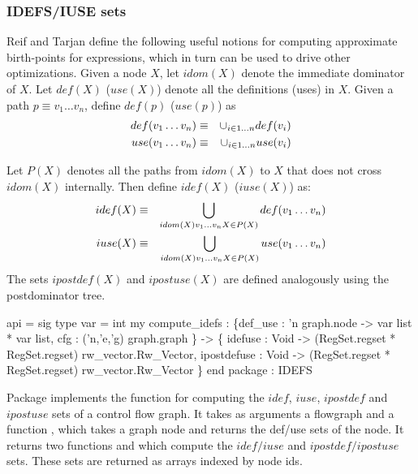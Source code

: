\subsubsection{IDEFS/IUSE sets}
Reif and Tarjan define the following useful notions for
computing approximate birth-points for expressions,  which in turn
can be used to drive other optimizations.
Given a node $X$, let $idom(X)$ denote the immediate dominator of $X$.
Let $def(X)$ ($use(X)$) denote all the definitions (uses) in $X$. 
Given a path $p \equiv v_1\ldots v_n$, define $def(p)$ ($use(p)$) as
\begin{eqnarray*}
   def(v_1\ldots v_n) & \equiv &\cup_{i \in 1 \ldots n} def(v_i) \\
   use(v_1\ldots v_n) & \equiv &\cup_{i \in 1 \ldots n} use(v_i)
\end{eqnarray*}

Let $P(X)$ denotes all the paths from $idom(X)$ to $X$
that does not cross $idom(X)$ internally.    Then define
$idef(X)$ ($iuse(X)$) as:
\begin{eqnarray*}
  idef(X) & \equiv & \bigcup_{idom(X) v_1 \ldots v_n X \in P(X)} 
     def(v_1\ldots v_n) \\
  iuse(X) & \equiv & \bigcup_{idom(X) v_1 \ldots v_n X \in P(X)} 
     use(v_1\ldots v_n) 
\end{eqnarray*}
The sets $ipostdef(X)$ and $ipostuse(X)$ are defined analogously
using the postdominator tree.

\begin{SML}
 api  = sig
   type var = int
   my compute_idefs : 
       \{def_use : 'n graph.node -> var list * var list,
        cfg     : ('n,'e,'g) graph.graph
       \} ->
       \{ idefuse      : Void -> (RegSet.regset * RegSet.regset) rw_vector.Rw_Vector,
         ipostdefuse  : Void -> (RegSet.regset * RegSet.regset) rw_vector.Rw_Vector
       \}
 end
 package  : IDEFS
\end{SML}
Package  implements the function 
 for computing
the $idef$, $iuse$, $ipostdef$ and $ipostuse$ sets of a control flow
graph.  It takes as arguments a flowgraph and a function , which
takes a graph node and returns the def/use sets of the node.
It returns two functions  and  which
compute the $idef/iuse$ and $ipostdef/ipostuse$ sets.  These sets
are returned as arrays indexed by node ids.
